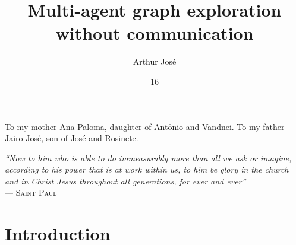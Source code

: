 \documentclass[tg, eng]{ita}    %
\author{Arthur Jos\'{e}}{de Sousa Rodrigues}
\title{Multi-agent graph exploration without communication}
\date{16}{Jun}{2023}
\begin{document}
\maketitle

\begin{itadedication}
To my mother Ana Paloma, daughter of Ant\^{o}nio and Vandnei. To my father Jairo Jos\'e, son of Jos\'e and Rosinete.
\end{itadedication}

\begin{itathanks}

\end{itathanks}

\thispagestyle{empty}
\ifhyperref{}\fi
\begin{flushright}
\begin{spacing}{1}
\mbox{}\vfill
{\sffamily\itshape
``Now to him who is able to do immeasurably more than all we ask or imagine, according to his power that is at work within us, to him be glory in the church and in Christ Jesus throughout all generations, for ever and ever''\\}
--- \textsc{Saint Paul}
\end{spacing}
\end{flushright}

\begin{abstract}
\noindent

\end{abstract}

\begin{englishabstract}
\noindent

\end{englishabstract}

\listoffigures %

\listoftables %

\listofalgorithms

\listofabbreviations

\listofsymbols

\tableofcontents

\mainmatter

\chapter{Introduction}

\end{document}
